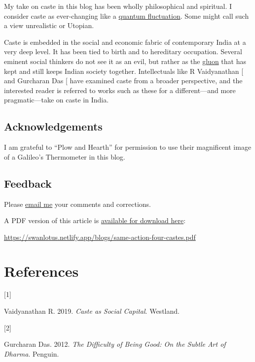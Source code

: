 \documentclass[
  a4paper,
]{article}
\newlength{\cslhangindent}
\newlength{\csllabelwidth}
\newenvironment{CSLReferences}[2] %
 {\begin{list}{}{%
  \setlength{\itemindent}{0pt}
  \setlength{\leftmargin}{0pt}
  \setlength{\parsep}{0pt}
  \ifodd #1
   \setlength{\leftmargin}{\cslhangindent}
   \setlength{\itemindent}{-1\cslhangindent}
  \fi
  \setlength{\itemsep}{#2\baselineskip}}}
 {\end{list}}
\newcommand{\CSLLeftMargin}[1]{\parbox[t]{\csllabelwidth}{\strut#1\strut}}
\newcommand{\CSLRightInline}[1]{\parbox[t]{\linewidth - \csllabelwidth}{\strut#1\strut}}
\begin{document}
My take on caste in this blog has been wholly philosophical and
spiritual. I consider caste as ever-changing like a
\href{https://en.wikipedia.org/wiki/Quantum_fluctuation}{quantum
fluctuation}. Some might call such a view unrealistic or Utopian.

Caste is embedded in the social and economic fabric of contemporary
India at a very deep level. It has been tied to birth and to hereditary
occupation. Several eminent social thinkers do not see it as an evil,
but rather as the \href{https://en.wikipedia.org/wiki/Gluon}{gluon} that
has kept and still keeps Indian society together. Intellectuals like R
Vaidyanathan {[}\citeproc{ref-rv-caste}{1}{]} and Gurcharan Das
{[}\citeproc{ref-das-dharma}{2}{]} have examined caste from a broader
perspective, and the interested reader is referred to works such as
these for a different---and more pragmatic---take on caste in India.

\subsection{Acknowledgements}\label{acknowledgements}

I am grateful to ``Plow and Hearth'' for permission to use their
magnificent image of a Galileo's Thermometer in this blog.

\subsection{Feedback}\label{feedback}

Please \href{mailto:feedback.swanlotus@gmail.com}{email me} your
comments and corrections.

\noindent A PDF version of this article is
\href{./same-action-four-castes.pdf}{available for download here}:

\begin{small}

\begin{sffamily}

\url{https://swanlotus.netlify.app/blogs/same-action-four-castes.pdf}

\end{sffamily}

\end{small}

\section*{References}\label{bibliography}

\label{refs}
\begin{CSLReferences}{0}{0}
\CSLLeftMargin{{[}1{]} }%
\CSLRightInline{Vaidyanathan R. 2019. \emph{{Caste as Social Capital}}.
Westland.}

\CSLLeftMargin{{[}2{]} }%
\CSLRightInline{Gurcharan Das. 2012. \emph{{The Difficulty of Being
Good}: {On the Subtle Art of Dharma}}. Penguin.}

\end{CSLReferences}
\end{document}
